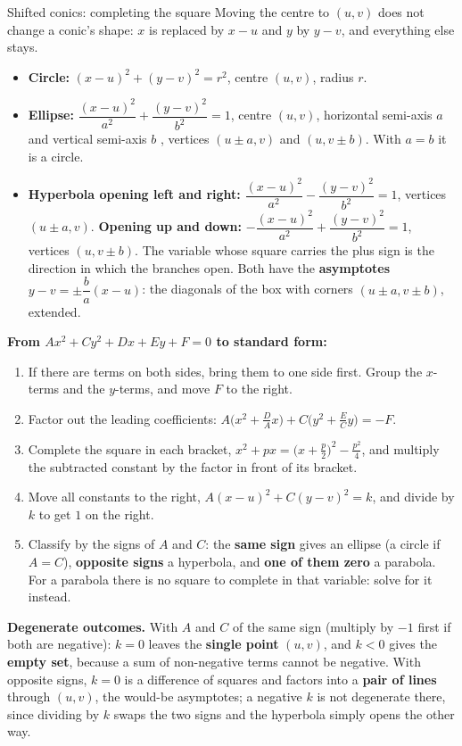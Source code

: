 \begin{rulebox}{Shifted conics: completing the square}
Moving the centre to $(u,v)$ does not change a conic's shape: $x$ is
replaced by $x-u$ and $y$ by $y-v$, and everything else stays.
\begin{itemize}[leftmargin=1.6em,itemsep=0.3ex]
  \item \textbf{Circle:} $(x-u)^{2}+(y-v)^{2}=r^{2}$, centre $(u,v)$,
        radius $r$.
  \item \textbf{Ellipse:} $\dfrac{(x-u)^{2}}{a^{2}}+\dfrac{(y-v)^{2}}{b^{2}}=1$,
        centre $(u,v)$, horizontal semi-axis $a$ and vertical semi-axis $b$
        , vertices $(u\pm a,v)$ and $(u,v\pm b)$. With
        $a=b$ it is a circle.
  \item \textbf{Hyperbola opening left and right:}
        $\dfrac{(x-u)^{2}}{a^{2}}-\dfrac{(y-v)^{2}}{b^{2}}=1$, vertices
        $(u\pm a,v)$. \textbf{Opening up and down:}
        $-\dfrac{(x-u)^{2}}{a^{2}}+\dfrac{(y-v)^{2}}{b^{2}}=1$, vertices
        $(u,v\pm b)$. The variable whose square carries the plus sign is the
        direction in which the branches open. Both have the
        \textbf{asymptotes} $y-v=\pm\dfrac{b}{a}(x-u)$: the diagonals of
        the box with corners $(u\pm a,v\pm b)$, extended.
\end{itemize}
\textbf{From $Ax^{2}+Cy^{2}+Dx+Ey+F=0$ to standard form:}
\begin{enumerate}[leftmargin=1.8em,itemsep=0.3ex]
  \item If there are terms on both sides, bring them to one side first.
        Group the $x$-terms and the $y$-terms, and move $F$ to the right.
  \item Factor out the leading coefficients:
        $A\bigl(x^{2}+\tfrac{D}{A}x\bigr)+C\bigl(y^{2}+\tfrac{E}{C}y\bigr)=-F$.
  \item Complete the square in each bracket,
        $x^{2}+px=\bigl(x+\tfrac{p}{2}\bigr)^{2}-\tfrac{p^{2}}{4}$, and
        multiply the subtracted constant by the factor in front of its
        bracket.
  \item Move all constants to the right, $A(x-u)^{2}+C(y-v)^{2}=k$, and
        divide by $k$ to get $1$ on the right.
  \item Classify by the signs of $A$ and $C$: the \textbf{same sign} gives
        an ellipse (a circle if $A=C$), \textbf{opposite signs} a
        hyperbola, and \textbf{one of them zero} a parabola. For a
        parabola there is no square to complete in that variable: solve
        for it instead.
\end{enumerate}
\textbf{Degenerate outcomes.} With $A$ and $C$ of the same sign (multiply
by $-1$ first if both are negative): $k=0$ leaves the \textbf{single
point} $(u,v)$, and $k<0$ gives the \textbf{empty set}, because a sum of
non-negative terms cannot be negative. With opposite signs, $k=0$ is a
difference of squares and factors into a \textbf{pair of lines} through
$(u,v)$, the would-be asymptotes; a negative $k$ is not degenerate there,
since dividing by $k$ swaps the two signs and the hyperbola simply opens the
other way.


\end{rulebox}
